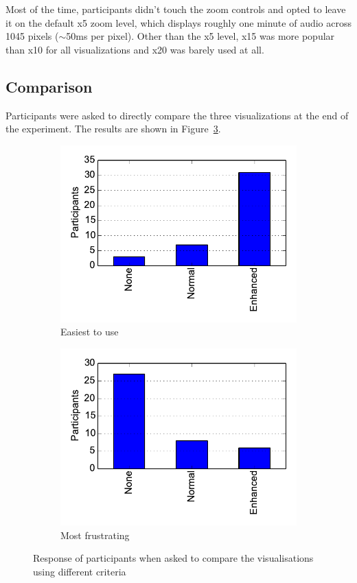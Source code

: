 Most of the time, participants didn't touch the zoom controls and opted to leave
it on the default x5 zoom level, which displays roughly one minute of audio
across 1045 pixels ($\sim$50ms per pixel). Other than the x5 level, x15 was
more popular than x10 for all visualizations and x20 was barely used at all.

\subsection{Comparison}
Participants were asked to directly compare the three visualizations at the end
of the experiment. The results are shown in Figure~\ref{fig:compare}.

\begin{figure}[ht]
\centering
\begin{subfigure}{.5\textwidth}
  \centering
  \includegraphics[width=\textwidth]{figs/easiest.pdf}
  \caption{Easiest to use}
  \label{fig:easiest}
\end{subfigure}%
\begin{subfigure}{.5\textwidth}
  \centering
  \includegraphics[width=\linewidth]{figs/frustrating.pdf}
  \caption{Most frustrating}
  \label{fig:frustrating}
\end{subfigure}
\caption{Response of participants when asked to compare the visualisations
  using different criteria}
\label{fig:compare}
\end{figure}

